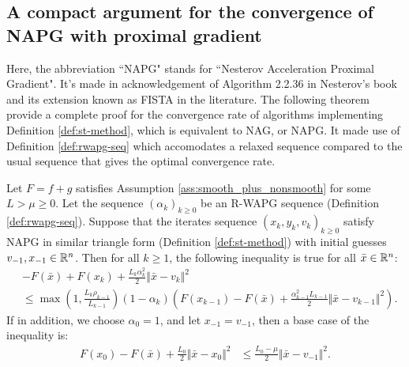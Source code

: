 \documentclass[12pt]{article}
\begin{document}
    \subsection{A compact argument for the convergence of NAPG with proximal gradient}
        Here, the abbreviation ``NAPG" stands for ``Nesterov Acceleration Proximal Gradient". 
        It's made in acknowledgement of Algorithm 2.2.36 in Nesterov's book \cite{nesterov_lectures_2018} and its extension known as FISTA in the literature.
        The following theorem provide a complete proof for the convergence rate of algorithms implementing Definition \ref{def:st-method}, which is equivalent to NAG, or NAPG. 
        It made use of Definition \ref{def:rwapg-seq} which accomodates a relaxed sequence compared to the usual sequence that gives the optimal convergence rate. 
        \begin{theorem}\label{thm:onestep-napg-cnvg}
            Let $F = f + g$ satisfies Assumption \ref{ass:smooth_plus_nonsmooth} for some $L > \mu \ge 0$. 
            Let the sequence $(\alpha_k)_{k \ge0}$ be an R-WAPG sequence (Definition \ref{def:rwapg-seq}). 
            Suppose that the iterates sequence $(x_k, y_k, v_k)_{k \ge 0}$ satisfy NAPG in similar triangle form (Definition \ref{def:st-method}) with initial guesses $v_{-1}, x_{-1} \in \mathbb R^n$. 
            Then for all $k \ge 1$, the following inequality is true for all $\bar x \in \mathbb R^n$: 
            \begin{align*}
                & - F(\bar x) + F(x_k) + \frac{L_k\alpha_k^2}{2}\Vert \bar x - v_k\Vert^2 
                \\
                & \le \max\left(1, \frac{L_k\rho_{k - 1}}{L_{k - 1}}\right)(1 - \alpha_k)\left(
                    F(x_{k - 1}) - F(\bar x) 
                    + \frac{\alpha_{k - 1}^2L_{k - 1}}{2}\Vert \bar x - v_{k - 1}\Vert^2
                \right). 
            \end{align*}
            If in addition, we choose $\alpha_0 = 1$, and let $x_{-1} = v_{-1}$, then a base case of the inequality is: 
            \begin{align*}
                F(x_{0}) - F(\bar x) + \frac{L_0}{2}\Vert \bar x - x_{0}\Vert^2 
                &\le \frac{L_0 - \mu}{2}\Vert \bar x - v_{-1}\Vert^2. 
            \end{align*}
        \end{theorem}
\end{document}
